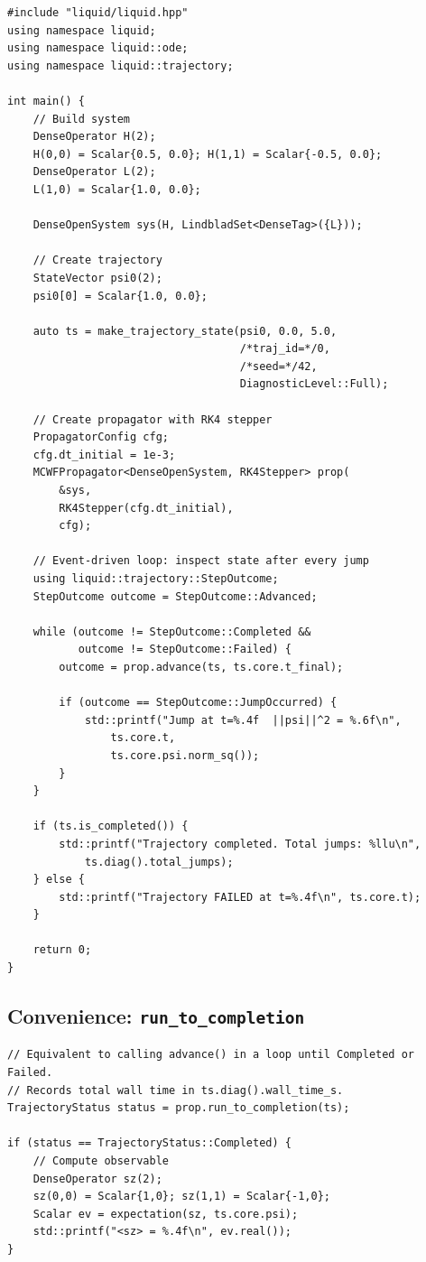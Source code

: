 \documentclass[11pt,a4paper,twoside]{book}
\theoremstyle{definition}
\theoremstyle{remark}
\begin{document}
\begin{verbatim}
#include "liquid/liquid.hpp"
using namespace liquid;
using namespace liquid::ode;
using namespace liquid::trajectory;

int main() {
    // Build system
    DenseOperator H(2);
    H(0,0) = Scalar{0.5, 0.0}; H(1,1) = Scalar{-0.5, 0.0};
    DenseOperator L(2);
    L(1,0) = Scalar{1.0, 0.0};

    DenseOpenSystem sys(H, LindbladSet<DenseTag>({L}));

    // Create trajectory
    StateVector psi0(2);
    psi0[0] = Scalar{1.0, 0.0};

    auto ts = make_trajectory_state(psi0, 0.0, 5.0,
                                    /*traj_id=*/0,
                                    /*seed=*/42,
                                    DiagnosticLevel::Full);

    // Create propagator with RK4 stepper
    PropagatorConfig cfg;
    cfg.dt_initial = 1e-3;
    MCWFPropagator<DenseOpenSystem, RK4Stepper> prop(
        &sys,
        RK4Stepper(cfg.dt_initial),
        cfg);

    // Event-driven loop: inspect state after every jump
    using liquid::trajectory::StepOutcome;
    StepOutcome outcome = StepOutcome::Advanced;

    while (outcome != StepOutcome::Completed &&
           outcome != StepOutcome::Failed) {
        outcome = prop.advance(ts, ts.core.t_final);

        if (outcome == StepOutcome::JumpOccurred) {
            std::printf("Jump at t=%.4f  ||psi||^2 = %.6f\n",
                ts.core.t,
                ts.core.psi.norm_sq());
        }
    }

    if (ts.is_completed()) {
        std::printf("Trajectory completed. Total jumps: %llu\n",
            ts.diag().total_jumps);
    } else {
        std::printf("Trajectory FAILED at t=%.4f\n", ts.core.t);
    }

    return 0;
}
\end{verbatim}

\subsection{Convenience: \texttt{run\_to\_completion}}
\label{subsec:run-to-completion}

\begin{verbatim}
// Equivalent to calling advance() in a loop until Completed or Failed.
// Records total wall time in ts.diag().wall_time_s.
TrajectoryStatus status = prop.run_to_completion(ts);

if (status == TrajectoryStatus::Completed) {
    // Compute observable
    DenseOperator sz(2);
    sz(0,0) = Scalar{1,0}; sz(1,1) = Scalar{-1,0};
    Scalar ev = expectation(sz, ts.core.psi);
    std::printf("<sz> = %.4f\n", ev.real());
}
\end{verbatim}
\end{document}
